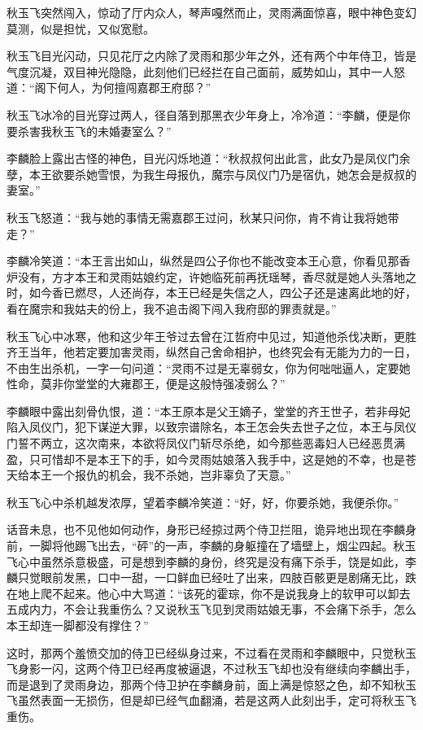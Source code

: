 秋玉飞突然闯入，惊动了厅内众人，琴声嘎然而止，灵雨满面惊喜，眼中神色变幻莫测，似是担忧，又似宽慰。

秋玉飞目光闪动，只见花厅之内除了灵雨和那少年之外，还有两个中年侍卫，皆是气度沉凝，双目神光隐隐，此刻他们已经拦在自己面前，威势如山，其中一人怒道：“阁下何人，为何擅闯嘉郡王府邸？”

秋玉飞冰冷的目光穿过两人，径自落到那黑衣少年身上，冷冷道：“李麟，便是你要杀害我秋玉飞的未婚妻室么？”

李麟脸上露出古怪的神色，目光闪烁地道：“秋叔叔何出此言，此女乃是凤仪门余孽，本王欲要杀她雪恨，为我生母报仇，魔宗与凤仪门乃是宿仇，她怎会是叔叔的妻室。”

秋玉飞怒道：“我与她的事情无需嘉郡王过问，秋某只问你，肯不肯让我将她带走？”

李麟冷笑道：“本王言出如山，纵然是四公子你也不能改变本王心意，你看见那香炉没有，方才本王和灵雨姑娘约定，许她临死前再抚瑶琴，香尽就是她人头落地之时，如今香已燃尽，人还尚存，本王已经是失信之人，四公子还是速离此地的好，看在魔宗和我姑夫的份上，我不追击阁下闯入我府邸的罪责就是。”

秋玉飞心中冰寒，他和这少年王爷过去曾在江哲府中见过，知道他杀伐决断，更胜齐王当年，他若定要加害灵雨，纵然自己舍命相护，也终究会有无能为力的一日，不由生出杀机，一字一句问道：“灵雨不过是无辜弱女，你为何咄咄逼人，定要她性命，莫非你堂堂的大雍郡王，便是这般恃强凌弱么？”

李麟眼中露出刻骨仇恨，道：“本王原本是父王嫡子，堂堂的齐王世子，若非母妃陷入凤仪门，犯下谋逆大罪，以致宗谱除名，本王怎会失去世子之位，本王与凤仪门誓不两立，这次南来，本欲将凤仪门斩尽杀绝，如今那些恶毒妇人已经恶贯满盈，只可惜却不是本王下的手，如今灵雨姑娘落入我手中，这是她的不幸，也是苍天给本王一个报仇的机会，我不杀她，岂非辜负了天意。”

秋玉飞心中杀机越发浓厚，望着李麟冷笑道：“好，好，你要杀她，我便杀你。”

话音未息，也不见他如何动作，身形已经掠过两个侍卫拦阻，诡异地出现在李麟身前，一脚将他踢飞出去，“砰”的一声，李麟的身躯撞在了墙壁上，烟尘四起。秋玉飞心中虽然杀意极盛，可是想到李麟的身份，终究是没有痛下杀手，饶是如此，李麟只觉眼前发黑，口中一甜，一口鲜血已经吐了出来，四肢百骸更是剧痛无比，跌在地上爬不起来。他心中大骂道：“该死的霍琮，你不是说我身上的软甲可以卸去五成内力，不会让我重伤么？又说秋玉飞见到灵雨姑娘无事，不会痛下杀手，怎么本王却连一脚都没有撑住？”

这时，那两个羞愤交加的侍卫已经纵身过来，不过看在灵雨和李麟眼中，只觉秋玉飞身影一闪，这两个侍卫已经再度被逼退，不过秋玉飞却也没有继续向李麟出手，而是退到了灵雨身边，那两个侍卫护在李麟身前，面上满是惊怒之色，却不知秋玉飞虽然表面一无损伤，但是却已经气血翻涌，若是这两人此刻出手，定可将秋玉飞重伤。


